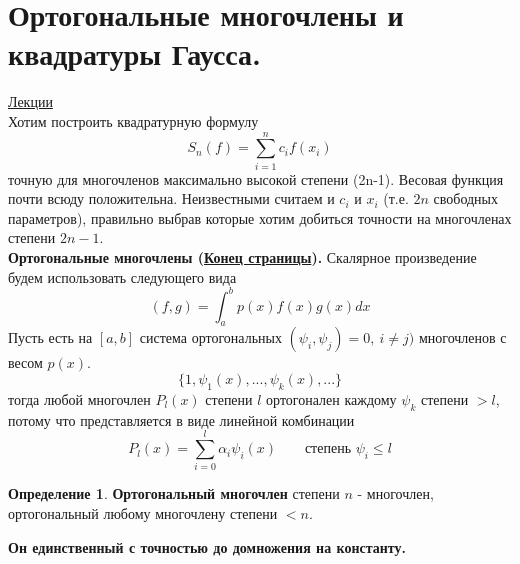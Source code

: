 \documentclass[specialist, subf, href, colorlinks=true, 12pt, times, mtpro, final]{disser}
\theoremstyle{definition}
\newtheorem{defn}{Определение}[section]
\begin{document}
\section {Ортогональные многочлены и квадратуры Гаусса.}
    \hyperlink {lects.40}{Лекции}\\
    Хотим построить квадратурную формулу
    $$
        S_n(f) = \sum\limits_{i = 1}^n c_i f(x_i)
    $$ 
    точную для многочленов максимально высокой степени (2n-1). Весовая функция почти всюду положительна. Неизвестными считаем и $c_i$ и  $x_i$ (т.е. $2n$ свободных параметров), правильно выбрав которые хотим добиться точности на многочленах степени $2n-1$. \\
    \textbf{Ортогональные многочлены (\hyperlink {lects.40}{Конец страницы}).}
    Скалярное произведение будем использовать следующего вида
    $$
        (f,g) = \int_a^b p(x)f(x)g(x) dx
    $$
    Пусть есть на $[a,b]$ система ортогональных $(\psi_i, \psi_j) = 0, \ i\ne j)$ многочленов с весом $p(x)$.
    $$
        \{1, \psi_1 (x), ..., \psi_k(x), ...\}
    $$
    тогда любой многочлен $P_l(x)$ степени $l$ ортогонален каждому $\psi_k$ степени $>l$, потому что представляется в виде линейной комбинации 
    $$
        P_l(x) = \sum\limits_{i = 0}^l \alpha_i \psi_i (x) \ \ \ \ \ \ \ \ \ \text{степень } \psi_i \le l
    $$
    \begin{defn}
        \textbf{Ортогональный многочлен} степени $n$ - многочлен, ортогональный любому многочлену степени $<n$.
    \end{defn}
    \noindent\textbf{Он единственный с точностью до домножения на константу.} \\
    
\end{document}
